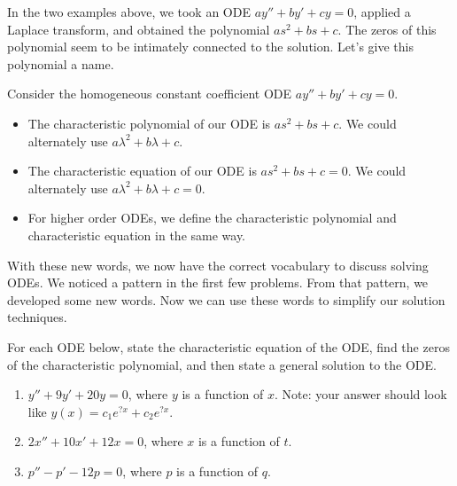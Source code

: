 In the two examples above, we took an ODE $ay''+by'+cy=0$, applied a Laplace transform, and obtained the polynomial $as^2+bs+c$.   The zeros of this polynomial seem to be intimately connected to the solution. Let's give this polynomial a name.
\begin{definition}
 Consider the homogeneous constant coefficient ODE $ay''+by'+cy=0$. 
\begin{itemize}
 \item The characteristic polynomial of our ODE is $as^2+bs+c$. We could alternately use $a\lambda^2+b\lambda +c$. 
 \item The characteristic equation of our ODE is $as^2+bs+c=0$. We could alternately use $a\lambda^2+b\lambda +c=0$.
 \item For higher order ODEs, we define the characteristic polynomial and characteristic equation in the same way. 
\end{itemize}
\end{definition}
With these new words, we now have the correct vocabulary to discuss solving ODEs. We noticed a pattern in the first few problems.  From that pattern, we developed some new words.  Now we can use these words to simplify our solution techniques.








\begin{problem}
For each ODE below, state the characteristic equation of the ODE, find the zeros of the characteristic polynomial, and then state a general solution to the ODE. 
\begin{enumerate}
 \item $y''+9y'+20y=0$, where $y$ is a function of $x$. Note: your answer should look like $y(x) = c_1e^{?x}+c_2e^{?x}$. 
 \item $2x''+10x'+12x=0$, where $x$ is a function of $t$.
 \item $p''-p'-12p=0$, where $p$ is a function of $q$.  
\end{enumerate}
\end{problem}








